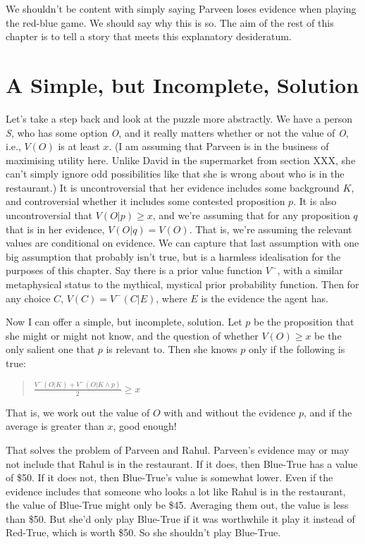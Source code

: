 \documentclass[11pt,]{book}
\begin{document}
We shouldn't be content with simply saying Parveen loses evidence when playing the red-blue game. We should say why this is so. The aim of the rest of this chapter is to tell a story that meets this explanatory desideratum.

\hypertarget{simplesolution}{%
\section{A Simple, but Incomplete, Solution}\label{simplesolution}}

Let's take a step back and look at the puzzle more abstractly. We have a person \emph{S}, who has some option \emph{O}, and it really matters whether or not the value of \emph{O}, i.e., \(V(O)\) is at least \(x\). (I am assuming that Parveen is in the business of maximising utility here. Unlike David in the supermarket from section XXX, she can't simply ignore odd possibilities like that she is wrong about who is in the restaurant.) It is uncontroversial that her evidence includes some background \(K\), and controversial whether it includes some contested proposition \(p\). It is also uncontroversial that \(V(O | p) \geq x\), and we're assuming that for any proposition \(q\) that is in her evidence, \(V(O | q) = V(O)\). That is, we're assuming the relevant values are conditional on evidence. We can capture that last assumption with one big assumption that probably isn't true, but is a harmless idealisation for the purposes of this chapter. Say there is a prior value function \(V^-\), with a similar metaphysical status to the mythical, mystical prior probability function. Then for any choice \(C\), \(V(C) = V^-(C | E)\), where \(E\) is the evidence the agent has.

Now I can offer a simple, but incomplete, solution. Let \(p\) be the proposition that she might or might not know, and the question of whether \(V(O) \geq x\) be the only salient one that \(p\) is relevant to. Then she knows \(p\) only if the following is true:

\begin{quote}
\(\frac{V^-(O | K) + V^-(O | K \wedge p)}{2} \geq x\)
\end{quote}

That is, we work out the value of \(O\) with and without the evidence \(p\), and if the average is greater than \(x\), good enough!

That solves the problem of Parveen and Rahul. Parveen's evidence may or may not include that Rahul is in the restaurant. If it does, then Blue-True has a value of \$50. If it does not, then Blue-True's value is somewhat lower. Even if the evidence includes that someone who looks a lot like Rahul is in the restaurant, the value of Blue-True might only be \$45. Averaging them out, the value is less than \$50. But she'd only play Blue-True if it was worthwhile it play it instead of Red-True, which is worth \$50. So she shouldn't play Blue-True.
\end{document}
